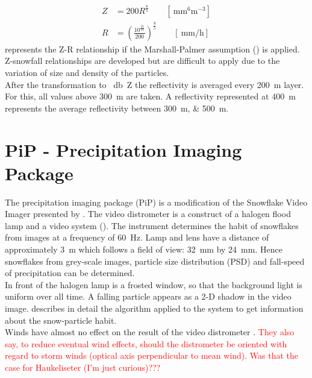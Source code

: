 \begin{align}
	Z & = 200 R^{\frac{8}{5}} \qquad [\SI{}{\mm^6\metre^{-3}} ] \nonumber \\ 
	R & = \left( \frac{ 10^{\frac{Ze}{10}} }{200} \right)^{\frac{8}{5}} \qquad [ \SI{}{\mm\per\hour} ]
	\label{eq:Z-R}
\end{align}
 represents the Z-R relationship if the Marshall-Palmer assumption () is applied. Z-snowfall relationships are developed but are difficult to apply due to the variation of size and density of the particles. \\
After the transformation to \SI{}{\decibel Z} the reflectivity is averaged every \SI{200}{\metre} layer. For this, all values above \SI{300}{\metre} are taken. A reflectivity represented at \SI{400}{\metre} represents the average reflectivity between \SIlist{300;500}{\metre}. 

\section{PiP - Precipitation Imaging Package}

The precipitation imaging package (PiP) is a modification of the Snowflake Video Imager presented by \cite{newman_presenting_2009}. The video distrometer is a construct of a halogen flood lamp and a video system (). The instrument determines the habit of snowflakes from images at a frequency of \SI{60}{\Hz}. Lamp and lens have a distance of approximately \SI{3}{\metre} which follows a field of view: \SI{32}{\mm} by \SI{24}{\mm}. Hence snowflakes from grey-scale images, particle size distribution (PSD) and fall-speed of precipitation can be determined. 
\\
In front of the halogen lamp is a frosted window, so that the background light is uniform over all time. A falling particle appears as a 2-D shadow in the video image. \cite{newman_presenting_2009} describes in detail the algorithm applied to the system to get information about the snow-particle habit. \\
Winds have almost no effect on the result of the video distrometer \citep{newman_presenting_2009}. \textcolor{red}{They also say, to reduce eventual wind effects, should the distrometer be oriented with regard to storm winds (optical axis perpendicular to mean wind). Was that the case for Haukeliseter (I'm just curious)???}

